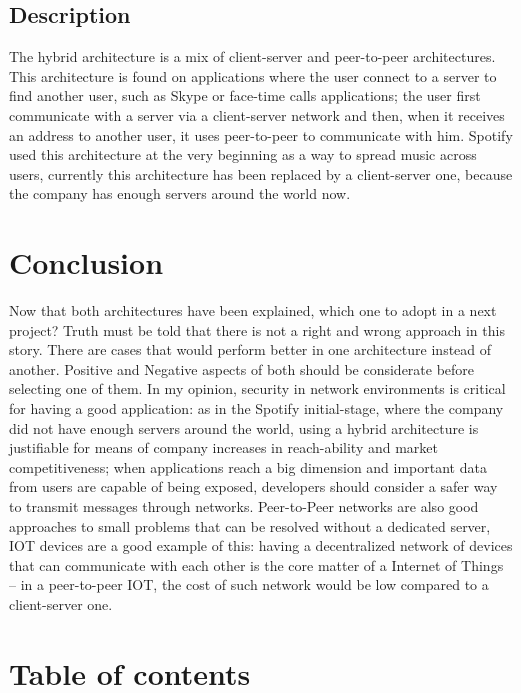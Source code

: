 \documentclass[12pt,a4paper]{article}
\begin{document}
\subsection{Description}

The hybrid architecture \cite{hhbrid} is a mix of client-server and peer-to-peer architectures. This architecture is found on applications where the user connect to a server to find another user, such as Skype or face-time calls applications; the user first communicate with a server via a client-server network and then, when it receives an address to another user, it uses peer-to-peer to communicate with him. Spotify \cite{spotify} used this architecture at the very beginning as a way to spread music across users, currently this architecture has been replaced by a client-server one, because the company has enough servers around the world now.


\section{Conclusion}

Now that both architectures have been explained, which one to adopt in a next project? Truth must be told that there is not a right and wrong approach in this story. There are cases that would perform better in one architecture instead of another. Positive and Negative aspects of both should be considerate before selecting one of them. In my opinion, security in network environments is critical for having a good application: as in the Spotify initial-stage\cite{spotify}, where the company did not have enough servers around the world, using a hybrid architecture is justifiable for means of company increases in reach-ability and market competitiveness; when applications reach a big dimension and important data from users are capable of being exposed, developers should consider a safer way to transmit messages through networks. Peer-to-Peer networks are also good approaches to small problems that can be resolved without a dedicated server, IOT devices are a good example of this: having a decentralized network of devices that can communicate with each other is the core matter of a Internet of Things -- in a peer-to-peer IOT, the cost of such network would be low compared to a client-server one.  









\section{Table of contents}


\tableofcontents


\printbibliography
\end{document}
